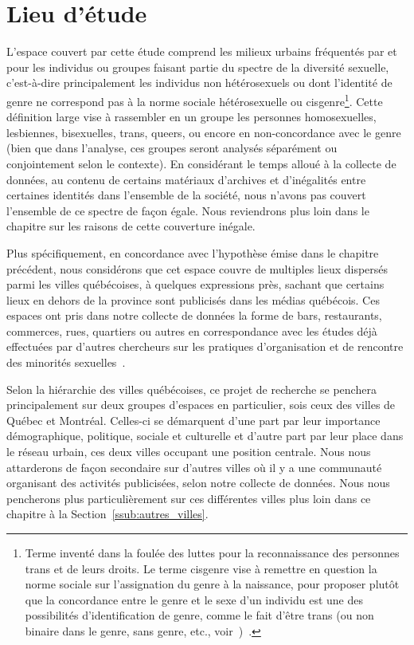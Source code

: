 \section{Lieu d'étude}
\label{sec:lieu_d_tude}
L'espace couvert par cette étude comprend les milieux urbains fréquentés par et pour les individus ou groupes faisant partie du spectre de la diversité sexuelle, c'est-à-dire principalement les individus non hétérosexuels ou dont l'identité de genre ne correspond pas à la norme sociale hétérosexuelle ou cisgenre\footnote{Terme inventé dans la foulée des luttes pour la reconnaissance des personnes trans et de leurs droits. 
Le terme cisgenre vise à remettre en  question la norme sociale sur l'assignation du genre à la naissance, pour  proposer plutôt que la concordance entre le genre et le sexe d'un individu est  une des possibilités d'identification de genre, comme le fait d'être trans (ou  non binaire dans le genre, sans genre, etc., voir~\cite{Barker2015})~\citep[150]{McGeeney2015}.}. 
Cette définition large vise à rassembler en un groupe les personnes homosexuelles, lesbiennes, bisexuelles, trans, queers, ou encore en non-concordance avec le genre (bien que dans l'analyse, ces groupes seront analysés séparément ou conjointement selon le contexte). 
En considérant le temps alloué à la collecte de données, au contenu de certains matériaux d'archives et d'inégalités entre certaines identités dans l'ensemble de la société, nous n'avons pas couvert l'ensemble de ce spectre de façon égale. 
Nous reviendrons plus loin dans le chapitre sur les raisons de cette couverture inégale.

Plus spécifiquement, en concordance avec l'hypothèse émise dans le chapitre précédent, nous considérons que cet espace couvre de multiples lieux dispersés parmi les villes québécoises, à quelques expressions près, sachant que certains lieux en dehors de la province sont publicisés dans les médias québécois. 
Ces espaces ont pris dans notre collecte de données la forme de bars, restaurants, commerces, rues, quartiers ou autres en correspondance avec les études déjà effectuées par d'autres chercheurs sur les pratiques d'organisation et de rencontre des minorités sexuelles~\citep{Higgins1999,Hinrichs2012}.

Selon la hiérarchie des villes québécoises, ce projet de recherche se penchera principalement sur deux groupes d'espaces en particulier, sois ceux des villes de Québec et Montréal. 
Celles-ci se démarquent d'une part par leur importance démographique, politique, sociale et culturelle et d'autre part par leur place dans le réseau urbain, ces deux villes occupant une position centrale. 
Nous nous attarderons de façon secondaire sur d'autres villes où il y a une communauté \lgbt{} organisant des activités publicisées, selon notre collecte de données. 
Nous nous pencherons plus particulièrement sur ces différentes villes plus loin dans ce chapitre à la Section~\ref{ssub:autres_villes}.


